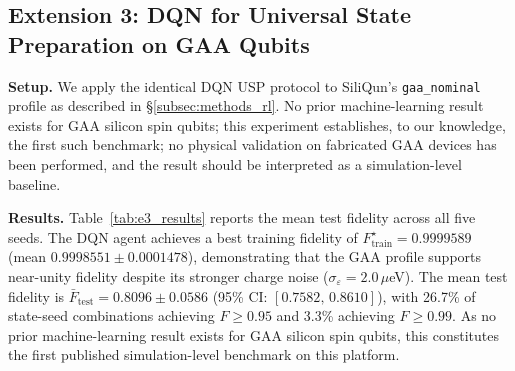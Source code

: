 \subsection{Extension 3: DQN for Universal State Preparation on GAA Qubits}
\label{subsec:e3_results}

\textbf{Setup.} We apply the identical DQN USP protocol to SiliQun's \texttt{gaa\_nominal} profile as described in \S\ref{subsec:methods_rl}. No prior machine-learning result exists for GAA silicon spin qubits; this experiment establishes, to our knowledge, the first such benchmark; no physical validation on fabricated GAA devices has been performed, and the result should be interpreted as a simulation-level baseline.

\textbf{Results.} Table~\ref{tab:e3_results} reports the mean test fidelity across all five seeds. The DQN agent achieves a best training fidelity of $F_\text{train}^\star = 0.9999589$ (mean $0.9998551 \pm 0.0001478$), demonstrating that the GAA profile supports near-unity fidelity despite its stronger charge noise ($\sigma_\varepsilon = 2.0$\,$\mu$eV). The mean test fidelity is $\bar{F}_\text{test} = 0.8096 \pm 0.0586$ (95\% CI: $[0.7582,\,0.8610]$), with 26.7\% of state-seed combinations achieving $F \geq 0.95$ and 3.3\% achieving $F \geq 0.99$. As no prior machine-learning result exists for GAA silicon spin qubits, this constitutes the first published simulation-level benchmark on this platform.

